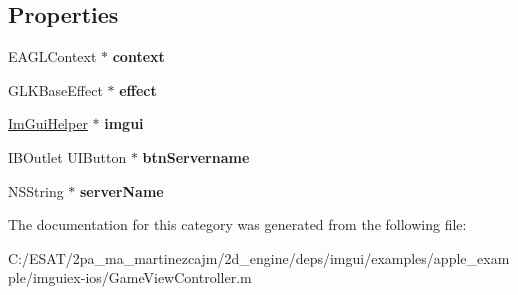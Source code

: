 \subsection*{Properties}
\begin{DoxyCompactItemize}
\item 
\mbox{\label{category_game_view_controller_07_08_a0faae9bb6914ccd71c8550177f95d41c}} 
E\+A\+G\+L\+Context $\ast$ {\bfseries context}
\item 
\mbox{\label{category_game_view_controller_07_08_a53280b505ca61093b8d82d82992330fb}} 
G\+L\+K\+Base\+Effect $\ast$ {\bfseries effect}
\item 
\mbox{\label{category_game_view_controller_07_08_aee3a706cc026721e847bc88745328456}} 
\hyperlink{interface_im_gui_helper}{Im\+Gui\+Helper} $\ast$ {\bfseries imgui}
\item 
\mbox{\label{category_game_view_controller_07_08_a1e2add53c4d5f1ac84797d0f9de6c363}} 
I\+B\+Outlet U\+I\+Button $\ast$ {\bfseries btn\+Servername}
\item 
\mbox{\label{category_game_view_controller_07_08_a73465f6e3339ed8ceafea1bac603cd41}} 
N\+S\+String $\ast$ {\bfseries server\+Name}
\end{DoxyCompactItemize}


The documentation for this category was generated from the following file\+:\begin{DoxyCompactItemize}
\item 
C\+:/\+E\+S\+A\+T/2pa\+\_\+ma\+\_\+martinezcajm/2d\+\_\+engine/deps/imgui/examples/apple\+\_\+example/imguiex-\/ios/Game\+View\+Controller.\+m\end{DoxyCompactItemize}
